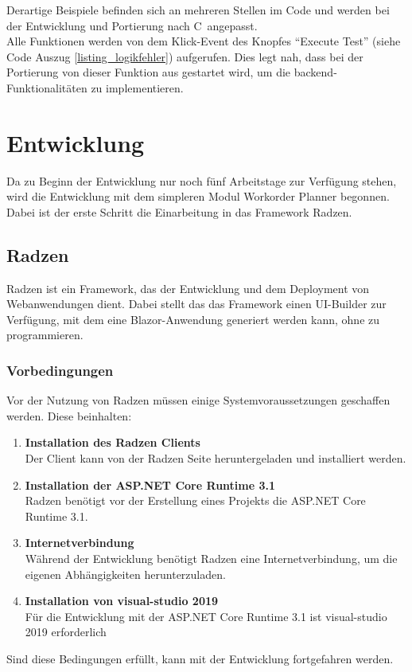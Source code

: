 \noindent Derartige Beispiele befinden sich an mehreren Stellen im Code und werden bei der Entwicklung und Portierung nach C\myHashtag\ angepasst.\\
Alle Funktionen werden von dem Klick-Event des Knopfes \enquote{Execute Test} (siehe Code Auszug \ref{listing_logikfehler}) aufgerufen. Dies legt nah, dass bei der Portierung von dieser Funktion aus gestartet wird, um die \gls{backend}-Funktionalitäten zu implementieren.

\section{Entwicklung}\label{sec-development}
Da zu Beginn der Entwicklung nur noch fünf Arbeitstage zur Verfügung stehen, wird die Entwicklung mit dem simpleren Modul Workorder Planner begonnen. Dabei ist der erste Schritt die Einarbeitung in das Framework Radzen.

\subsection{Radzen}
Radzen ist ein Framework, das der Entwicklung und dem Deployment von Webanwendungen dient. Dabei stellt das das Framework einen \gls{UI}-Builder zur Verfügung, mit dem eine Blazor-Anwendung generiert werden kann, ohne zu programmieren.

\subsubsection{Vorbedingungen}
Vor der Nutzung von Radzen müssen einige Systemvoraussetzungen geschaffen werden. Diese beinhalten:
\begin{enumerate}
\item \textbf{Installation des Radzen Clients}\\
Der Client kann von der Radzen Seite heruntergeladen und installiert werden.
\item \textbf{Installation der ASP.NET Core Runtime 3.1}\\
Radzen benötigt vor der Erstellung eines Projekts die ASP.NET Core Runtime 3.1.
\item \textbf{Internetverbindung}\\
Während der Entwicklung benötigt Radzen eine Internetverbindung, um die eigenen Abhängigkeiten herunterzuladen.
\item \textbf{Installation von \gls{visual-studio} 2019}\\
Für die Entwicklung mit der ASP.NET Core Runtime 3.1 ist \gls{visual-studio} 2019 erforderlich
\end{enumerate}
Sind diese Bedingungen erfüllt, kann mit der Entwicklung fortgefahren werden.\\

